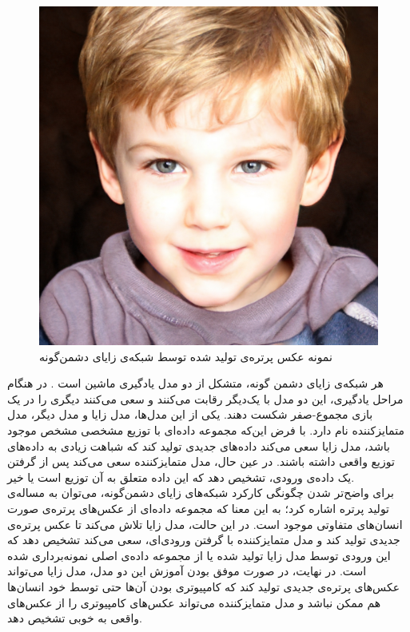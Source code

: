 \begin{figure}
	\centering
	\includegraphics[scale=0.17]{figures/fakeperson.jpg}
	\caption [
	نمونه عکس پرتره‌ی تولید شده توسط شبکه‌ی زایای دشمن‌گونه
	]{
	نمونه عکس پرتره‌ی تولید شده توسط شبکه‌ی زایای دشمن‌گونه
	\cite{thisperson}
	}
	\label{fig:lstmblock}
\end{figure}

هر شبکه‌ی زایای دشمن گونه، متشکل از دو مدل یادگیری ماشین است
\cite{goodfellow_gan}.
در هنگام مراحل یادگیری، این دو مدل با یک‌دیگر رقابت می‌کنند و سعی می‌کنند دیگری را در یک بازی مجموع-صفر شکست دهند. یکی از این مدل‌ها، مدل زایا و مدل دیگر، مدل متمایزکننده نام دارد. 
با فرض این‌که مجموعه داده‌ای با توزیع مشخصی
مشخص موجود باشد، مدل زایا سعی می‌کند داده‌های جدیدی تولید کند که شباهت زیادی به داده‌های توزیع واقعی داشته باشند. در عین حال، مدل متمایزکننده سعی می‌کند پس از گرفتن یک داده‌ی ورودی، تشخیص دهد که این داده متعلق به آن توزیع است یا خیر.
\\
برای واضح‌تر شدن چگونگی کارکرد شبکه‌های زایای دشمن‌گونه، می‌توان به مساله‌ی تولید پرتره اشاره کرد؛ به این معنا که مجموعه داده‌ای از عکس‌های پرتره‌ی صورت انسان‌های متفاوتی موجود است. در این حالت، مدل زایا تلاش می‌کند تا عکس پرتره‌ی جدیدی تولید کند و مدل متمایزکننده با گرفتن ورودی‌ای، سعی می‌کند تشخیص دهد که این ورودی توسط مدل زایا تولید شده یا از مجموعه داده‌ی اصلی نمونه‌برداری شده است.
در نهایت، در صورت موفق بودن آموزش این دو مدل، مدل زایا می‌تواند عکس‌های پرتره‌ی جدیدی تولید کند که کامپیوتری بودن آن‌ها حتی توسط خود انسان‌ها هم ممکن نباشد و مدل متمایزکننده می‌تواند عکس‌های کامپیوتری را از عکس‌های واقعی به خوبی تشخیص دهد. 
